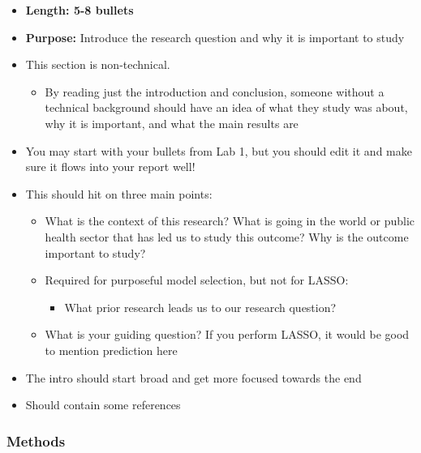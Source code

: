 \documentclass[
  letterpaper,
  DIV=11,
  numbers=noendperiod]{scrartcl}
\providecommand{\tightlist}{%
  \setlength{\itemsep}{0pt}\setlength{\parskip}{0pt}}\usepackage{longtable,booktabs,array}
\begin{document}
\begin{itemize}
\tightlist
\item
  \textbf{Length: 5-8 bullets}
\item
  \textbf{Purpose:} Introduce the research question and why it is
  important to study
\item
  This section is non-technical.

  \begin{itemize}
  \tightlist
  \item
    By reading just the introduction and conclusion, someone without a
    technical background should have an idea of what they study was
    about, why it is important, and what the main results are
  \end{itemize}
\item
  You may start with your bullets from Lab 1, but you should edit it and
  make sure it flows into your report well!
\item
  This should hit on three main points:

  \begin{itemize}
  \tightlist
  \item
    What is the context of this research? What is going in the world or
    public health sector that has led us to study this outcome? Why is
    the outcome important to study?
  \item
    Required for purposeful model selection, but not for LASSO:

    \begin{itemize}
    \tightlist
    \item
      What prior research leads us to our research question?
    \end{itemize}
  \item
    What is your guiding question? If you perform LASSO, it would be
    good to mention prediction here
  \end{itemize}
\item
  The intro should start broad and get more focused towards the end
\item
  Should contain some references
\end{itemize}

\subsubsection{Methods}\label{methods}
\end{document}
